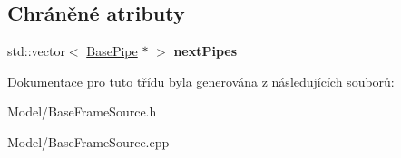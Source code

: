 \subsection*{Chráněné atributy}
\begin{DoxyCompactItemize}
\item 
\hypertarget{class_ar_pipe_1_1_base_frame_source_a095bf6e429526c21b16c111adec1a6ec}{std\-::vector$<$ \hyperlink{class_ar_pipe_1_1_base_pipe}{Base\-Pipe} $\ast$ $>$ {\bfseries next\-Pipes}}\label{d6/d97/class_ar_pipe_1_1_base_frame_source_a095bf6e429526c21b16c111adec1a6ec}

\end{DoxyCompactItemize}


Dokumentace pro tuto třídu byla generována z následujících souborů\-:\begin{DoxyCompactItemize}
\item 
Model/Base\-Frame\-Source.\-h\item 
Model/Base\-Frame\-Source.\-cpp\end{DoxyCompactItemize}
